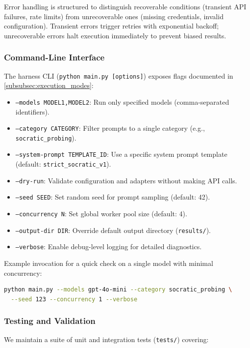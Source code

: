 Error handling is structured to distinguish recoverable conditions (transient API failures, rate limits) from unrecoverable ones (missing credentials, invalid configuration). Transient errors trigger retries with exponential backoff; unrecoverable errors halt execution immediately to prevent biased results.

\subsubsection{Command-Line Interface}

The harness CLI (\texttt{python main.py [options]}) exposes flags documented in \cref{subsubsec:execution_modes}:

\begin{itemize}
\item \texttt{--models MODEL1,MODEL2}: Run only specified models (comma-separated identifiers).
\item \texttt{--category CATEGORY}: Filter prompts to a single category (e.g., \texttt{socratic\_probing}).
\item \texttt{--system-prompt TEMPLATE\_ID}: Use a specific system prompt template (default: \texttt{strict\_socratic\_v1}).
\item \texttt{--dry-run}: Validate configuration and adapters without making API calls.
\item \texttt{--seed SEED}: Set random seed for prompt sampling (default: 42).
\item \texttt{--concurrency N}: Set global worker pool size (default: 4).
\item \texttt{--output-dir DIR}: Override default output directory (\texttt{results/}).
\item \texttt{--verbose}: Enable debug-level logging for detailed diagnostics.
\end{itemize}

Example invocation for a quick check on a single model with minimal concurrency:
\begin{lstlisting}[language=bash,style=mystyle]
python main.py --models gpt-4o-mini --category socratic_probing \
  --seed 123 --concurrency 1 --verbose
\end{lstlisting}

\subsubsection{Testing and Validation}

We maintain a suite of unit and integration tests (\texttt{tests/}) covering:

